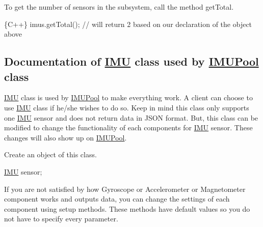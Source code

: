 To get the number of sensors in the subsystem, call the method {\ttfamily get\+Total}.


\begin{DoxyCode}
\{C++\}
imus.getTotal();                    // will return 2 based on our declaration of the object above
\end{DoxyCode}


\subsection*{Documentation of \hyperlink{class_i_m_u}{I\+MU} class used by \hyperlink{class_i_m_u_pool}{I\+M\+U\+Pool} class}

{\ttfamily \hyperlink{class_i_m_u}{I\+MU}} class is used by \hyperlink{class_i_m_u_pool}{I\+M\+U\+Pool} to make everything work. A client can choose to use {\ttfamily \hyperlink{class_i_m_u}{I\+MU}} class if he/she wishes to do so. Keep in mind this class only supports one \hyperlink{class_i_m_u}{I\+MU} sensor and does not return data in J\+S\+ON format. But, this class can be modified to change the functionality of each components for \hyperlink{class_i_m_u}{I\+MU} sensor. These changes will also show up on {\ttfamily \hyperlink{class_i_m_u_pool}{I\+M\+U\+Pool}}.

Create an object of this class.


\begin{DoxyCode}
\hyperlink{class_i_m_u}{IMU} sensor;
\end{DoxyCode}


If you are not satisfied by how {\ttfamily Gyroscope} or {\ttfamily Accelerometer} or {\ttfamily Magnetometer} component works and outputs data, you can change the settings of each component using {\ttfamily setup} methods. These methods have default values so you do not have to specify every parameter.


